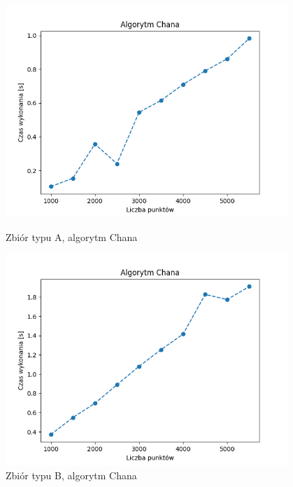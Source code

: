 \documentclass[11pt]{article}
\theoremstyle{remark} \newtheorem{definition}{def.}
\theoremstyle{definition} \newtheorem{twierdzenie}{tw.}
\begin{document}
\begin{figure}[]
    \centering
    \begin{minipage}{0.48\textwidth}
        \centering
        \includegraphics[width=0.95\textwidth]{../tests/chmura-chan.png} %
        \caption{Zbiór typu A, algorytm Chana}
        \label{fig:chmura-chan}
    \end{minipage}\hfill
    \begin{minipage}{0.48\textwidth}
        \centering
        \includegraphics[width=0.95\textwidth]{../tests/okrag-chan.png} %
        \caption{Zbiór typu B, algorytm Chana}
        \label{fig:okrag-chan}
    \end{minipage}
\end{figure}
\end{document}
